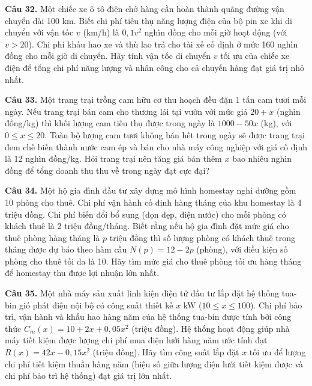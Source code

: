 \documentclass[12pt]{article}
\begin{document}
	\vspace{0.6cm}
	\noindent \textbf{Câu 32.} Một chiếc xe ô tô điện chở hàng cần hoàn thành quãng đường vận chuyển dài 100 km. Biết chi phí tiêu thụ năng lượng điện của bộ pin xe khi di chuyển với vận tốc $v$ (km/h) là $0,1v^2$ nghìn đồng cho mỗi giờ hoạt động (với $v > 20$). Chi phí khấu hao xe và thù lao trả cho tài xế cố định ở mức 160 nghìn đồng cho mỗi giờ di chuyển. Hãy tính vận tốc di chuyển $v$ tối ưu của chiếc xe điện để tổng chi phí năng lượng và nhân công cho cả chuyến hàng đạt giá trị nhỏ nhất.
	
	\vspace{0.6cm}
	\noindent \textbf{Câu 33.} Một trang trại trồng cam hữu cơ thu hoạch đều đặn 1 tấn cam tươi mỗi ngày. Nếu trang trại bán cam cho thương lái tại vườn với mức giá $20 + x$ (nghìn đồng/kg) thì khối lượng cam tiêu thụ được trong ngày là $1000 - 50x$ (kg), với $0 \le x \le 20$. Toàn bộ lượng cam tươi không bán hết trong ngày sẽ được trang trại đem chế biến thành nước cam ép và bán cho nhà máy công nghiệp với giá cố định là 12 nghìn đồng/kg. Hỏi trang trại nên tăng giá bán thêm $x$ bao nhiêu nghìn đồng để tổng doanh thu thu về trong ngày đạt cực đại?
	
	\vspace{0.6cm}
	\noindent \textbf{Câu 34.} Một hộ gia đình đầu tư xây dựng mô hình homestay nghỉ dưỡng gồm 10 phòng cho thuê. Chi phí vận hành cố định hàng tháng của khu homestay là 4 triệu đồng. Chi phí biến đổi bổ sung (dọn dẹp, điện nước) cho mỗi phòng có khách thuê là 2 triệu đồng/tháng. Biết rằng nếu hộ gia đình đặt mức giá cho thuê phòng hàng tháng là $p$ triệu đồng thì số lượng phòng có khách thuê trong tháng được dự báo theo hàm cầu $N(p) = 12 - 2p$ (phòng), với điều kiện số phòng cho thuê tối đa là 10. Hãy tìm mức giá cho thuê phòng tối ưu hàng tháng để homestay thu được lợi nhuận lớn nhất.
	
	\vspace{0.6cm}
	\noindent \textbf{Câu 35.} Một nhà máy sản xuất linh kiện điện tử đầu tư lắp đặt hệ thống tua-bin gió phát điện nội bộ có công suất thiết kế $x$ kW ($10 \le x \le 100$). Chi phí bảo trì, vận hành và khấu hao hàng năm của hệ thống tua-bin được tính bởi công thức $C_m(x) = 10 + 2x + 0,05x^2$ (triệu đồng). Hệ thống hoạt động giúp nhà máy tiết kiệm được lượng chi phí mua điện lưới hàng năm ước tính đạt $R(x) = 42x - 0,15x^2$ (triệu đồng). Hãy tìm công suất lắp đặt $x$ tối ưu để lượng chi phí tiết kiệm thuần hàng năm (hiệu số giữa lượng điện lưới tiết kiệm được và chi phí bảo trì hệ thống) đạt giá trị lớn nhất.
	
\end{document}
